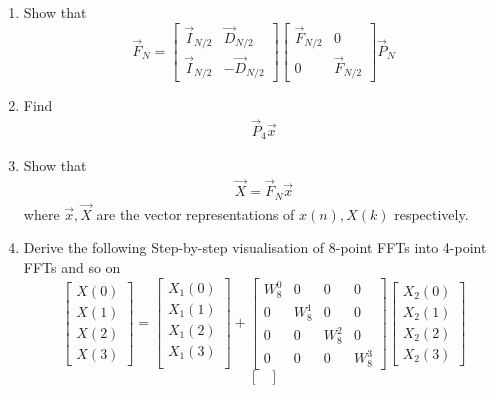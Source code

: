 \documentclass[journal,12pt,twocolumn]{IEEEtran}
\renewcommand\thesection{\arabic{section}}
\begin{document}
\begin{enumerate}[label=\arabic*.,ref=\thesection.\theenumi]
\item Show that 
\begin{equation}
\vec{F}_{N}=
\begin{bmatrix}
\vec{I}_{N/2} & \vec{D}_{N/2} \\
\vec{I}_{N/2} & -\vec{D}_{N/2}
\end{bmatrix}
\begin{bmatrix}
\vec{F}_{N/2} & 0 \\
0 & \vec{F}_{N/2}
\end{bmatrix}
\vec{P}_{N}
\end{equation}
\item Find 
    \begin{align}
	     \vec{P}_4 \vec{x}
    \end{align}
\item Show that 
    \begin{align}
	    \vec{X} = \vec{F}_N \vec{x}
	    \label{eq:dft-mat-def}
    \end{align}
		where $\vec{x}, \vec{X}$ are the vector representations of $x(n), X(k)$ respectively.
\item Derive the following Step-by-step visualisation  of
8-point FFTs into 4-point FFTs and so on
\begin{equation}
\begin{bmatrix}
X(0) \\ 
X(1) \\ 
X(2) \\ 
X(3)
\end{bmatrix}
=
\begin{bmatrix}
X_{1}(0) \\ 
X_{1}(1)\\ 
X_{1}(2)\\
X_{1}(3)\\
\end{bmatrix}
+
\begin{bmatrix}
W^{0}_{8} & 0 & 0 & 0\\
0 & W^{1}_{8} & 0 & 0\\
0 & 0 & W^{2}_{8} & 0\\
0 & 0 & 0 & W^{3}_{8}
\end{bmatrix}
\begin{bmatrix}
X_{2}(0) \\ 
X_{2}(1) \\ 
X_{2}(2) \\
X_{2}(3)
\end{bmatrix}
\end{equation}
\begin{equation}
\begin{bmatrix}

\end{bmatrix}
\end{equation}
\end{enumerate}
\end{document}
